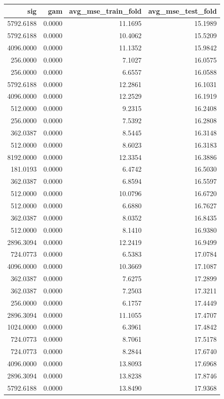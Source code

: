 \begin{tabular}{rrrr}
\toprule
sig & gam & avg_mse_train_fold & avg_mse_test_fold \\
\midrule
5792.6188 & 0.0000 & 11.1695 & 15.1989 \\
5792.6188 & 0.0000 & 10.4062 & 15.5209 \\
4096.0000 & 0.0000 & 11.1352 & 15.9842 \\
256.0000 & 0.0000 & 7.1027 & 16.0575 \\
256.0000 & 0.0000 & 6.6557 & 16.0588 \\
5792.6188 & 0.0000 & 12.2861 & 16.1031 \\
4096.0000 & 0.0000 & 12.2529 & 16.1919 \\
512.0000 & 0.0000 & 9.2315 & 16.2408 \\
256.0000 & 0.0000 & 7.5392 & 16.2808 \\
362.0387 & 0.0000 & 8.5445 & 16.3148 \\
512.0000 & 0.0000 & 8.6023 & 16.3183 \\
8192.0000 & 0.0000 & 12.3354 & 16.3886 \\
181.0193 & 0.0000 & 6.4742 & 16.5030 \\
362.0387 & 0.0000 & 6.8594 & 16.5597 \\
512.0000 & 0.0000 & 10.0796 & 16.6720 \\
512.0000 & 0.0000 & 6.6880 & 16.7627 \\
362.0387 & 0.0000 & 8.0352 & 16.8435 \\
512.0000 & 0.0000 & 8.1410 & 16.9380 \\
2896.3094 & 0.0000 & 12.2419 & 16.9499 \\
724.0773 & 0.0000 & 6.5383 & 17.0784 \\
4096.0000 & 0.0000 & 10.3669 & 17.1087 \\
362.0387 & 0.0000 & 7.6275 & 17.2899 \\
362.0387 & 0.0000 & 7.2503 & 17.3211 \\
256.0000 & 0.0000 & 6.1757 & 17.4449 \\
2896.3094 & 0.0000 & 11.1055 & 17.4707 \\
1024.0000 & 0.0000 & 6.3961 & 17.4842 \\
724.0773 & 0.0000 & 8.7061 & 17.5178 \\
724.0773 & 0.0000 & 8.2844 & 17.6740 \\
4096.0000 & 0.0000 & 13.8093 & 17.6968 \\
2896.3094 & 0.0000 & 13.8238 & 17.8746 \\
5792.6188 & 0.0000 & 13.8490 & 17.9368 \\

\end{tabular}

